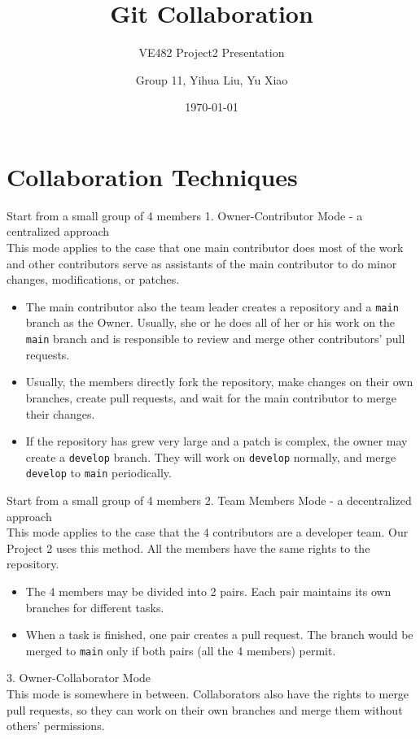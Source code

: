 \documentclass[12pt]{beamer}
\begin{document}
\title{Git Collaboration}
\subtitle{VE482 Project2 Presentation}
\author[Group 11]{Group 11, Yihua Liu, Yu Xiao}
\date{\today}
\begin{frame}
    \titlepage
\end{frame}

\section{Collaboration Techniques}
\begin{frame}{Start from a small group of 4 members}
    1. Owner-Contributor Mode - a centralized approach\\
    This mode applies to the case that one main contributor does most of the work and other contributors serve as assistants of the main contributor to do minor changes, modifications, or patches.
    \begin{itemize}
        \item The main contributor also the team leader creates a repository and a \texttt{main} branch as the Owner. Usually, she or he does all of her or his work on the \texttt{main} branch and is responsible to review and merge other contributors' pull requests.
        \item Usually, the members directly fork the repository, make changes on their own branches, create pull requests, and wait for the main contributor to merge their changes.
        \item If the repository has grew very large and a patch is complex, the owner may create a \texttt{develop} branch. They will work on \texttt{develop} normally, and merge \texttt{develop} to \texttt{main} periodically.
    \end{itemize}
\end{frame}
\begin{frame}{Start from a small group of 4 members}
    2. Team Members Mode - a decentralized approach\\
    This mode applies to the case that the 4 contributors are a developer team. Our Project 2 uses this method. All the members have the same rights to the repository.
    \begin{itemize}
        \item The 4 members may be divided into 2 pairs. Each pair maintains its own branches for different tasks.
        \item When a task is finished, one pair creates a pull request. The branch would be merged to \texttt{main} only if both pairs (all the 4 members) permit.
    \end{itemize}
    3. Owner-Collaborator Mode\\
    This mode is somewhere in between. Collaborators also have the rights to merge pull requests, so they can work on their own branches and merge them without others' permissions.
\end{frame}
\end{document}
